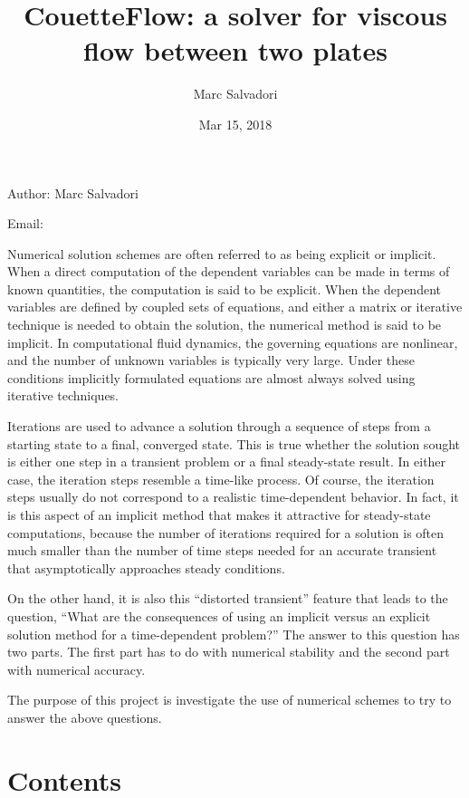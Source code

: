\documentclass[letterpaper,10pt,english]{sphinxmanual}
\title{CouetteFlow: a solver for viscous flow between two plates}
\date{Mar 15, 2018}
\author{Marc Salvadori}
\begin{document}
\maketitle
\sphinxtableofcontents
{}\label{\detokenize{index::doc}}


Author: Marc Salvadori

Email: 

Numerical solution schemes are often referred to as being explicit or implicit. When a direct computation of the dependent variables can be made in terms of known quantities, the computation is said to be explicit. When the dependent variables are defined by coupled sets of equations, and either a matrix or iterative technique is needed to obtain the solution, the numerical method is said to be implicit. In computational fluid dynamics, the governing equations are nonlinear, and the number of unknown variables is typically very large. Under these conditions implicitly formulated equations are almost always solved using iterative techniques.

Iterations are used to advance a solution through a sequence of steps from a starting state to a final, converged state. This is true whether the solution sought is either one step in a transient problem or a final steady-state result. In either case, the iteration steps resemble a time-like process. Of course, the iteration steps usually do not correspond to a realistic time-dependent behavior. In fact, it is this aspect of an implicit method that makes it attractive for steady-state computations, because the number of iterations required for a solution is often much smaller than the number of time steps needed for an accurate transient that asymptotically approaches steady conditions.

On the other hand, it is also this “distorted transient” feature that leads to the question, “What are the consequences of using an implicit versus an explicit solution method for a time-dependent problem?” The answer to this question has two parts. The first part has to do with numerical stability and the second part with numerical accuracy.

The purpose of this project is investigate the use of numerical schemes to try to answer the above questions.


\chapter{Contents}
\label{\detokenize{index:documentaion-for-solving-couetteflow-with-different-numerical-schemes}}\label{\detokenize{index:contents}}
\end{document}
